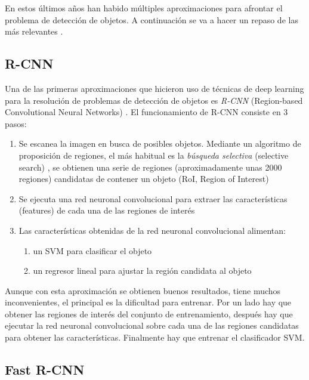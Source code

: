 En estos últimos años han habido múltiples aproximaciones para afrontar el problema de detección de objetos. A continuación se va a hacer un repaso de las más relevantes \cite{s2_stateofart1} \cite{s2_stateofart2} \cite{s2_stateofart5} \cite{s2_stateofart6} \cite{s2_stateofart7}.

\subsection*{R-CNN}

Una de las primeras aproximaciones que hicieron uso de técnicas de deep learning para la resolución de problemas de detección de objetos es \textit{R-CNN} (Region-based Convolutional Neural Networks) \cite{s2_stateofart4}. El funcionamiento de R-CNN consiste en 3 pasos:

\begin{enumerate}
	\item Se escanea la imagen en busca de posibles objetos. Mediante un algoritmo de proposición de regiones, el más habitual es la \textit{búsqueda selectiva} (selective search) \cite{s2_stateofart3}, se obtienen una serie de regiones (aproximadamente unas 2000 regiones) candidatas de contener un objeto (RoI, Region of Interest)
	\item Se ejecuta una red neuronal convolucional para extraer las características (features) de cada una de las regiones de interés
	\item Las características obtenidas de la red neuronal convolucional alimentan:
	\begin{enumerate}
		\item un SVM para clasificar el objeto
		\item un regresor lineal para ajustar la región candidata al objeto
	\end{enumerate}
\end{enumerate}

Aunque con esta aproximación se obtienen buenos resultados, tiene muchos inconvenientes, el principal es la dificultad para entrenar. Por un lado hay que obtener las regiones de interés del conjunto de entrenamiento, después hay que ejecutar la red neuronal convolucional sobre cada una de las regiones candidatas para obtener las características. Finalmente hay que entrenar el clasificador SVM.

\subsection*{Fast R-CNN}

